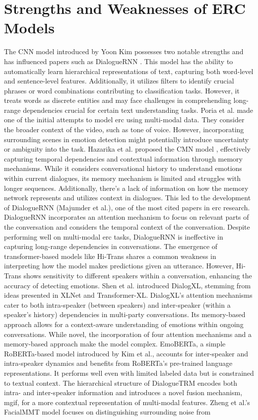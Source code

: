 \section{Strengths and Weaknesses of ERC Models}

    The CNN model \cite{cnn-text} introduced by Yoon Kim possesses two notable strengths and has influenced papers such as DialogueRNN \cite{dialoguernn}. This model has the ability to automatically learn hierarchical representations of text, capturing both word-level and sentence-level features. Additionally, it utilizes filters to identify crucial phrases or word combinations contributing to classification tasks. However, it treats words as discrete entities and may face challenges in comprehending long-range dependencies crucial for certain text understanding tasks. Poria et al. \cite{bclstm} made one of the initial attempts to model \ac{erc} using multi-modal data. They consider the broader context of the video, such as tone of voice. However, incorporating surrounding scenes in emotion detection might potentially introduce uncertainty or ambiguity into the task. Hazarika et al. proposed the CMN model \cite{cmn}, effectively capturing temporal dependencies and contextual information through memory mechanisms. While it considers conversational history to understand emotions within current dialogues, its memory mechanism is limited and struggles with longer sequences. Additionally, there's a lack of information on how the memory network represents and utilizes context in dialogues. This led to the development of DialogueRNN (Majumder et al.), one of the most cited papers in \ac{erc} research. DialogueRNN incorporates an attention mechanism to focus on relevant parts of the conversation and considers the temporal context of the conversation. Despite performing well on multi-modal \ac{erc} tasks, DialogueRNN is ineffective in capturing long-range dependencies in conversations. The emergence of transformer-based models like Hi-Trans shares a common weakness in interpreting how the model makes predictions given an utterance. However, Hi-Trans shows sensitivity to different speakers within a conversation, enhancing the accuracy of detecting emotions. Shen et al. introduced DialogXL, stemming from ideas presented in XLNet and Transformer-XL. DialogXL's attention mechanisms cater to both intra-speaker (between speakers) and inter-speaker (within a speaker's history) dependencies in multi-party conversations. Its memory-based approach allows for a context-aware understanding of emotions within ongoing conversations. While novel, the incorporation of four attention mechanisms and a memory-based approach make the model complex. EmoBERTa, a simple RoBERTa-based model introduced by Kim et al., accounts for inter-speaker and intra-speaker dynamics and benefits from RoBERTa's pre-trained language representations. It performs well even with limited labeled data but is constrained to textual context. The hierarchical structure of DialogueTRM \cite{dialoguetrm} encodes both intra- and inter-speaker information and introduces a novel fusion mechanism, \ac{mgif}, for a more contextual representation of multi-modal features. Zheng et al.'s FacialMMT \cite{fmmt} model focuses on distinguishing surrounding noise from 